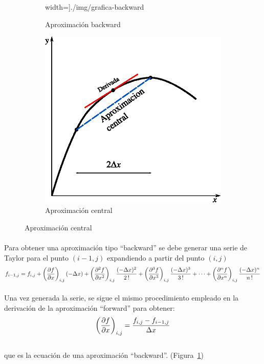 \documentclass[letterpaper, openright, 12pt]{book}
\begin{document}
\begin{figure}[htbp!]
\begin{subfigure}[c]{0.45\textwidth}
                width=\textwidth]{./img/grafica-backward}
            \caption{Aproximación backward}
            \label{fig:grafica_backward}
        \end{subfigure}
        \begin{subfigure}[c]{0.45\textwidth}
            \includegraphics[keepaspectratio,
                width=\textwidth]{./img/grafica-central}
            \caption{Aproximación central}
            \label{fig:grafica_central}
        \end{subfigure}
        \label{fig:grafica_aproximaciones}
    \end{figure}

\paragraph*{}
    Para obtener una aproximación tipo ``backward'' se debe generar una serie de Taylor para el punto $(i-1, j)$ expandiendo a partir del punto $(i, j)$
    \begin{equation}
    f_{i-1, j} = f_{i,j} + \left(\pdv{f}{x}\right)_{i,j} (-\Delta x)
    + \left(\pdv[2]{f}{x} \right)_{i,j} \frac{(-\Delta x)^2 }{2\,!}
    + \left( \pdv[3]{f}{x} \right)_{i,j} \frac{(-\Delta x)^3}{3\,!}
    + \dotsb + \left(\pdv[n]{f}{x} \right)_{i,j} \frac{(-\Delta x)^n}{n\,!}
    \label{taylor-backward}
    \end{equation}
\paragraph{}
    Una vez generada la serie, se sigue el mismo procedimiento empleado en la
    derivación de la aproximación ``forward'' para obtener:
    \begin{equation}
    \left( \pdv{f}{x} \right)_{i,j} = \frac{f_{i,j} - f_{i-1,j}}{\Delta x}
    \label{backward-x1}
    \end{equation}
    \\que es la ecuación de una aproximación ``backward''. (Figura~\ref{fig:grafica_backward})
\end{document}
